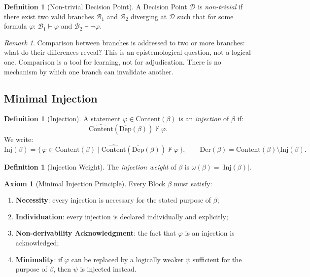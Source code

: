 \documentclass[12pt, a4paper]{article}
\theoremstyle{plain}
\theoremstyle{definition}
\newtheorem{definition}[theorem]{Definition}
\newtheorem{axiom}[theorem]{Axiom}
\theoremstyle{remark}
\newtheorem{remark}[theorem]{Remark}
\newcommand{\Inj}[1]{\mathrm{Inj}(#1)}
\newcommand{\Der}[1]{\mathrm{Der}(#1)}
\newcommand{\IW}[1]{\omega(#1)}
\newcommand{\DC}[1]{\overline{\mathrm{Dep}}(#1)}
\newcommand{\CC}[1]{\widehat{\mathrm{Content}}(#1)}
\begin{document}
\begin{definition}[Non-trivial Decision Point]
\label{def:nontrivial}
A Decision Point $\mathcal{D}$ is \emph{non-trivial} if there
exist two valid branches $\mathcal{B}_1$ and $\mathcal{B}_2$
diverging at $\mathcal{D}$ such that for some formula $\varphi$:
$\mathcal{B}_1 \vdash \varphi$ and
$\mathcal{B}_2 \vdash \neg\varphi$.
\end{definition}

\begin{remark}
Comparison between branches is addressed to two or more branches:
what do their differences reveal? This is an epistemological
question, not a logical one. Comparison is a tool for learning,
not for adjudication. There is no mechanism by which one branch
can invalidate another.
\end{remark}

\subsection{Minimal Injection}
\label{subsec:injection}

\begin{definition}[Injection]
\label{def:injection}
A statement $\varphi \in \mathrm{Content}(\beta)$ is an
\emph{injection} of $\beta$ if:
\[
  \CC{\DC{\beta}} \nvdash \varphi.
\]
We write:
\[
  \Inj{\beta}
  = \bigl\{\,\varphi \in \mathrm{Content}(\beta)
    \mid \CC{\DC{\beta}} \nvdash \varphi\,\bigr\},
  \qquad
  \Der{\beta} = \mathrm{Content}(\beta) \setminus \Inj{\beta}.
\]
\end{definition}

\begin{definition}[Injection Weight]
\label{def:injection-weight}
The \emph{injection weight} of $\beta$ is
$\IW{\beta} = |\Inj{\beta}|$.
\end{definition}

\begin{axiom}[Minimal Injection Principle]
\label{ax:minimal}
Every Block $\beta$ must satisfy:
\begin{enumerate}
  \item \textbf{Necessity}: every injection is necessary for the
        stated purpose of $\beta$;
  \item \textbf{Individuation}: every injection is declared
        individually and explicitly;
  \item \textbf{Non-derivability Acknowledgment}: the fact that
        $\varphi$ is an injection is acknowledged;
  \item \textbf{Minimality}: if $\varphi$ can be replaced by a
        logically weaker $\psi$ sufficient for the purpose of
        $\beta$, then $\psi$ is injected instead.
\end{enumerate}
\end{axiom}
\end{document}
